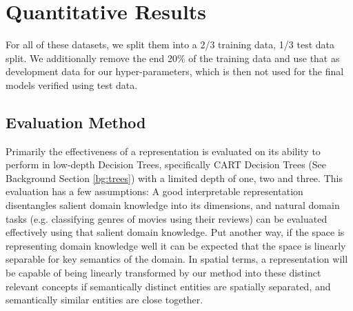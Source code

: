

\section{Quantitative Results}



 For all of these datasets, we split them into a 2/3 training data, 1/3 test data split. We additionally remove the end 20\% of the training data and use that as development data for our hyper-parameters, which is then not used for the final models verified using test data.  

\subsection{Evaluation Method}

Primarily the effectiveness of a representation is evaluated on its ability to perform in low-depth Decision Trees, specifically CART Decision Trees (See Background Section \ref{bg:trees}) with a limited depth of one, two and three. This evaluation has a few assumptions: A good interpretable representation disentangles salient domain knowledge into its dimensions, and natural domain tasks (e.g. classifying genres of movies using their reviews) can be evaluated effectively using that salient domain knowledge. Put another way, if the space is representing domain knowledge well it can be expected that the space is linearly separable for key semantics of the domain. In spatial terms, a representation will be capable of being linearly transformed by our method into these distinct relevant concepts if semantically distinct entities are spatially separated, and semantically similar entities are close together.

